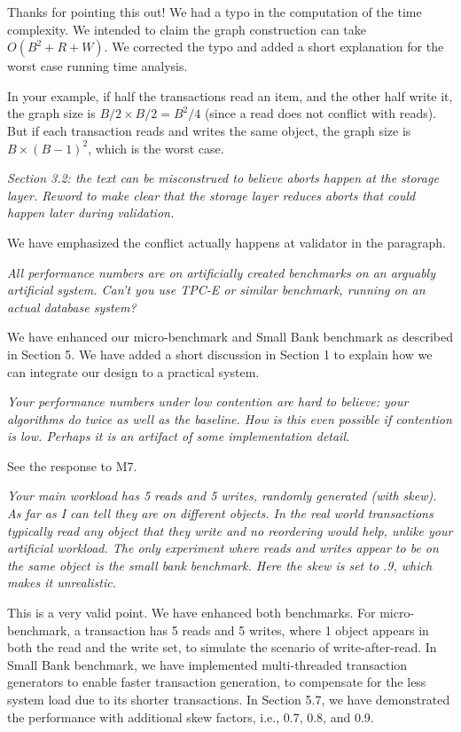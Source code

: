 \documentclass{article}
\begin{document}
\bigskip
Thanks for pointing this out! We had a typo in the computation of the time complexity. We intended to claim the graph construction can take $O(B^2+R+W)$. We corrected the typo and added a short explanation for the worst case running time analysis.

In your example, if half the transactions read an item, and the other half write it, the graph size is $B/2\times B/2=B^2/4$ (since a read does not conflict with reads). But if each transaction reads and writes the same object, the graph size is $B\times (B-1)^2$, which is the worst case.

\bigskip

\emph{Section 3.2: the text can be misconstrued to believe aborts happen at the storage layer. Reword to make clear that the storage layer reduces aborts that could happen later during validation.}


\bigskip
We have emphasized the conflict actually happens at validator in the paragraph. 
\bigskip

\emph{All performance numbers are on artificially created benchmarks on an arguably artificial system. Can't you use TPC-E or similar benchmark, running on an actual database system?}


\bigskip
We have enhanced our micro-benchmark and Small Bank benchmark as described in Section 5. We have added a short discussion in Section 1 to explain how we can integrate our design to a practical system.
\bigskip

\emph{Your performance numbers under low contention are hard to believe: your algorithms do twice as well as the baseline. How is this even possible if contention is low. Perhaps it is an artifact of some implementation detail.}


\bigskip
See the response to M7.
\bigskip

\emph{Your main workload has 5 reads and 5 writes, randomly generated (with skew). As far as I can tell they are on different objects. In the real world transactions typically read any object that they write and no reordering would help, unlike your artificial workload. The only experiment where reads and writes appear to be on the same object is the small bank benchmark. Here the skew is set to .9, which makes it unrealistic. }


\bigskip
This is a very valid point. We have enhanced both benchmarks. For micro-benchmark, a transaction has 5 reads and 5 writes, where 1 object appears in both the read and the write set, to simulate the scenario of write-after-read. In Small Bank benchmark, we have implemented multi-threaded transaction generators to enable faster transaction generation, to compensate for the less system load due to its shorter transactions. In Section 5.7, we have demonstrated the performance with additional skew factors, i.e., 0.7, 0.8, and 0.9.
\bigskip
\end{document}

